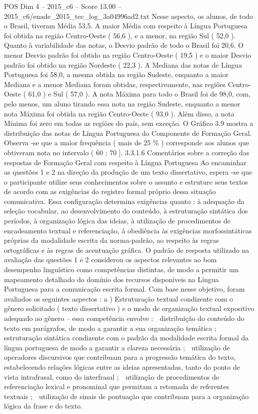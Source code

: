 \begin{textsample}{POS Dim 4 – 2015\_c6 – Score 13.00 – 2015\_c6/enade\_2015\_tec\_log\_3a04996ad2.txt}
Nesse aspecto, os alunos, de todo o Brasil, tiveram Média 53,5.
A maior Média com respeito à Língua Portuguesa foi obtida na região Centro-Oeste ( 56,6 ), e a menor, na região Sul ( 52,0 ).
Quanto à variabilidade das notas, o Desvio padrão de todo o Brasil foi 20,6.
O menor Desvio padrão foi obtido na região Centro-Oeste ( 19,5 ) e o maior Desvio padrão foi obtido na região Nordeste ( 22,3 ).
A Mediana das notas de Língua Portuguesa foi 58,0, a mesma obtida na região Sudeste, enquanto a maior Mediana e a menor Mediana foram obtidas, respectivamente, nas regiões Centro-Oeste ( 61,0 ) e Sul ( 57,0 ).
A nota Máxima para todo o Brasil foi de 98,0, com, pelo menos, um aluno tirando essa nota na região Sudeste, enquanto a menor nota Máxima foi obtida na região Centro-Oeste ( 93,0 ).
Além disso, a nota Mínima foi zero em todas as regiões do país, sem exceção.
O Gráfico 3.9 mostra a distribuição das notas de Língua Portuguesa do Componente de Formação Geral.
Observa -se que a maior frequência ( mais de 25 \% ) corresponde aos alunos que obtiveram nota no intervalo ( 60 ; 70 ]. 3.3.1.6 Comentários sobre a correção das respostas de Formação Geral com respeito à Língua Portuguesa Ao encaminhar as questões 1 e 2 na direção da produção de um texto dissertativo, espera -se que o participante utilize seus conhecimentos sobre o assunto e estruture seus textos de acordo com as exigências do registro formal próprio dessa situação comunicativa.
Essa configuração determina exigências quanto : à adequação da seleção vocabular, ao desenvolvimento do conteúdo, à estruturação sintática dos períodos, à organização lógica das ideias, à utilização de procedimentos de encadeamento textual e referenciação, à obediência às exigências morfossintáticas próprias da modalidade escrita da norma-padrão, ao respeito às regras ortográficas e às regras de acentuação gráfica.
O padrão de resposta utilizado na avaliação das questões 1 e 2 considerou os aspectos relevantes ao bom desempenho linguístico como competências distintas, de modo a permitir um mapeamento detalhado do domínio dos recursos disponíveis na Língua Portuguesa para a comunicação escrita formal.
Com base nesse objetivo, foram avaliados os seguintes aspectos : a ) Estruturação textual condizente com o gênero solicitado ( texto dissertativo ) e o modo de organização textual expositivo adequado ao gênero – essa competência envolve :  distribuição do conteúdo do texto em parágrafos, de modo a garantir a sua organização temática ;  estruturação sintática condizente com o padrão da modalidade escrita formal da língua portuguesa de modo a garantir a clareza necessária ;  utilização de operadores discursivos que contribuam para a progressão temática do texto, estabelecendo relações lógicas entre as ideias apresentadas, tanto do ponto de vista intrafrasal, como do interfrasal ;  utilização de procedimentos de referenciação lexical e pronominal que permitam a retomada de referentes textuais ;  utilização de sinais de pontuação que contribuam para a organização lógica da frase e do texto.

\end{textsample}
